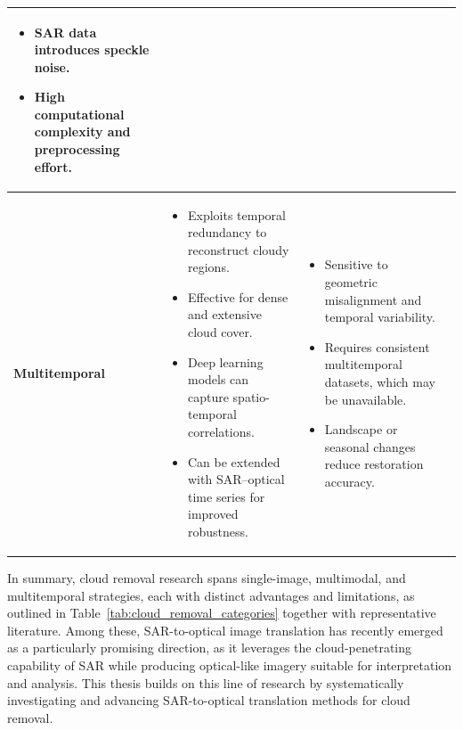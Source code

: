 \begin{table}[ht]
\begin{adjustbox}{max width=\textwidth, keepaspectratio=false}
\begin{tabular}{p{2.5cm} p{6cm} p{6cm} p{3cm}}
\begin{itemize}[nosep,leftmargin=*]
  \item SAR data introduces speckle noise.
  \item High computational complexity and preprocessing effort.
\end{itemize} &
\cite{A_cGAN_fuse_sar_MS_CR} \cite{sar2opt_cGAN_Optim_oppr_limits} \cite{syn_ms_sar_opt_MT_cGAN} \cite{CR_SEN2_dRNN} \cite{GAN_gen_synt_MS} \cite{s2o_ViT_cGAN} \cite{CR_RS_GAN_s2o} \cite{s2o_Thermodynamics} \cite{c_diffusion_s2o} \cite{s2o_color_super_diff} \cite{S2MS_GAN} \cite{SAR_DeCR} \\
\midrule
\textbf{Multitemporal} &
\begin{itemize}[nosep,leftmargin=*]
  \item Exploits temporal redundancy to reconstruct cloudy regions.
  \item Effective for dense and extensive cloud cover.
  \item Deep learning models can capture spatio-temporal correlations.
  \item Can be extended with SAR–optical time series for improved robustness.
\end{itemize} &
\begin{itemize}[nosep,leftmargin=*]
  \item Sensitive to geometric misalignment and temporal variability.
  \item Requires consistent multitemporal datasets, which may be unavailable.
  \item Landscape or seasonal changes reduce restoration accuracy.
\end{itemize} &
\cite{syn_ms_sar_opt_MT_cGAN} \cite{CR_RS_spati_atten_GAN} \cite{UnCRtainTS} \cite{assessing_MT_cGANS_s2o_crop} \cite{DiffCR} \\
\bottomrule
\end{tabular}
\end{adjustbox}
\end{table}

In summary, cloud removal research spans single-image, multimodal, and multitemporal strategies, each with distinct advantages and limitations, as outlined in Table~\ref{tab:cloud_removal_categories} together with representative literature. Among these, SAR-to-optical image translation has recently emerged as a particularly promising direction, as it leverages the cloud-penetrating capability of SAR while producing optical-like imagery suitable for interpretation and analysis. This thesis builds on this line of research by systematically investigating and advancing SAR-to-optical translation methods for cloud removal.

